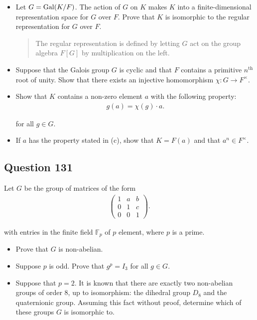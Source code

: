 \documentclass[12pt]{article}
\begin{document}
\begin{itemize}
\item
  Let \(G=\mathrm{Gal}(K/F)\). The action of \(G\) on \(K\) makes \(K\) into a
  finite-dimensional representation space for \(G\) over \(F\). Prove
  that \(K\) is isomorphic to the regular representation for \(G\) over
  \(F\).

  \begin{quote}
  The regular representation is defined by letting \(G\) act on the
  group algebra \(F[G]\) by multiplication on the left.
  \end{quote}
\item
  Suppose that the Galois group \(G\) is cyclic and that \(F\) contains
  a primitive \(n^{\text{th}}\) root of unity. Show that there exists an
  injective homomorphism \(\chi:G\rightarrow F^{\times}\).
\item
  Show that \(K\) contains a non-zero element \(a\) with the following
  property: \begin{align*}
  g(a)=\chi(g)\cdot a
  .\end{align*}

  for all \(g\in G\).
\item
  If \(a\) has the property stated in (c), show that \(K=F(a)\) and that
  \(a^n\in F^{\times}\).
\end{itemize}

\hypertarget{question-131}{%
\subsection{Question 131}\label{question-131}}

Let \(G\) be the group of matrices of the form \begin{align*}
\begin{pmatrix}
  1 & a & b\\
  0 & 1 & c\\
  0 & 0 & 1
\end{pmatrix}
.\end{align*}

with entries in the finite field \(\mathbb F_p\) of \(p\) element, where
\(p\) is a prime.

\begin{itemize}
\item
  Prove that \(G\) is non-abelian.
\item
  Suppose \(p\) is odd. Prove that \(g^p=I_3\) for all \(g\in G\).
\item
  Suppose that \(p=2\). It is known that there are exactly two
  non-abelian groups of order 8, up to isomorphism: the dihedral group
  \(D_8\) and the quaternionic group. Assuming this fact without proof,
  determine which of these groups \(G\) is isomorphic to.
\end{itemize}
\end{document}
